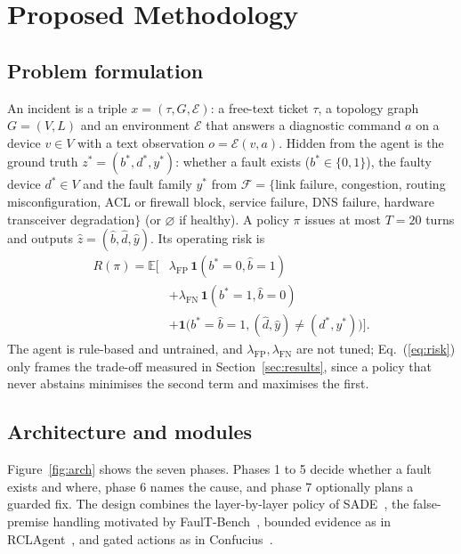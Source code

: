 \documentclass[pdflatex,sn-basic,Numbered,iicol]{sn-jnl}
\begin{document}
\section{Proposed Methodology}\label{sec:method}

\subsection{Problem formulation}\label{sec:formulation}
An incident is a triple $x=(\tau, G, \mathcal{E})$: a free-text ticket $\tau$, a topology graph $G=(V,L)$ and an environment $\mathcal{E}$ that answers a diagnostic command $a$ on a device $v\in V$ with a text observation $o=\mathcal{E}(v,a)$. Hidden from the agent is the ground truth $z^{*}=(b^{*},d^{*},y^{*})$: whether a fault exists ($b^{*}\in\{0,1\}$), the faulty device $d^{*}\in V$ and the fault family $y^{*}$ from $\mathcal{F}=\{$link failure, congestion, routing misconfiguration, ACL or firewall block, service failure, DNS failure, hardware transceiver degradation$\}$ (or $\varnothing$ if healthy). A policy $\pi$ issues at most $T=20$ turns and outputs $\hat z=(\hat b,\hat d,\hat y)$. Its operating risk is
\begin{equation}
\begin{split}R(\pi)=\mathbb{E}\Big[&\lambda_{\mathrm{FP}}\,\mathbf{1}(b^{*}=0,\hat b=1)\\&+\lambda_{\mathrm{FN}}\,\mathbf{1}(b^{*}=1,\hat b=0)\\&+\mathbf{1}\big(b^{*}=\hat b=1,(\hat d,\hat y)\neq(d^{*},y^{*})\big)\Big].\end{split}
\label{eq:risk}
\end{equation}
The agent is rule-based and untrained, and $\lambda_{\mathrm{FP}},\lambda_{\mathrm{FN}}$ are not tuned; Eq.~(\ref{eq:risk}) only frames the trade-off measured in Section~\ref{sec:results}, since a policy that never abstains minimises the second term and maximises the first.

\subsection{Architecture and modules}\label{sec:arch}
Figure~\ref{fig:arch} shows the seven phases. Phases 1 to 5 decide whether a fault exists and where, phase 6 names the cause, and phase 7 optionally plans a guarded fix. The design combines the layer-by-layer policy of SADE~\cite{tseng2026sade}, the false-premise handling motivated by FaulT-Bench~\cite{tseng2026faultbench}, bounded evidence as in RCLAgent~\cite{zhang2026rclagent}, and gated actions as in Confucius~\cite{wang2025confucius}.
\end{document}
